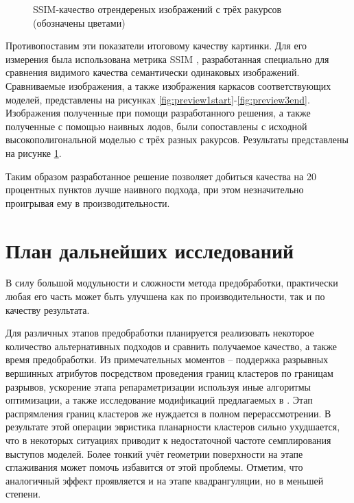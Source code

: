 \documentclass[12pt]{extarticle}
\begin{document}
\begin{figure}
  \centering
  \caption{SSIM-качество отрендереных изображений с трёх ракурсов (обозначены цветами)}
  \label{fig:quality}
\end{figure}

Противопоставим эти показатели итоговому качеству картинки. Для его измерения была использована метрика SSIM \cite{wang2004image}, разработанная специально для сравнения видимого качества семантически одинаковых изображений. Сравниваемые изображения, а также изображения каркасов соответствующих моделей, представлены на рисунках \ref{fig:preview1start}-\ref{fig:preview3end}. Изображения полученные при помощи разработанного решения, а также полученные с помощью наивных лодов, были сопоставлены с исходной высокополигональной моделью с трёх разных ракурсов. Результаты представлены на рисунке \ref{fig:quality}.

Таким образом разработанное решение позволяет добиться качества на 20 процентных пунктов лучше наивного подхода, при этом незначительно проигрывая ему в производительности.


\section{План дальнейших исследований}
В силу большой модульности и сложности метода предобработки, практически любая его часть может быть улучшена как по производительности, так и по качеству результата.

Для различных этапов предобработки планируется реализовать некоторое количество альтернативных подходов и сравнить получаемое качество, а также время предобработки. Из примечательных моментов -- поддержка разрывных вершинных атрибутов посредством проведения границ кластеров по границам разрывов, ускорение этапа репараметризации используя иные алгоритмы оптимизации, а также исследование модификаций предлагаемых в \cite{feng2010feature}. Этап распрямления границ кластеров же нуждается в полном перерассмотрении. В результате этой операции эвристика планарности кластеров сильно ухудшается, что в некоторых ситуациях приводит к недостаточной частоте семплирования выступов моделей. Более тонкий учёт геометрии поверхности на этапе сглаживания может помочь избавится от этой проблемы. Отметим, что аналогичный эффект проявляется и на этапе квадрангуляции, но в меньшей степени.
\end{document}
